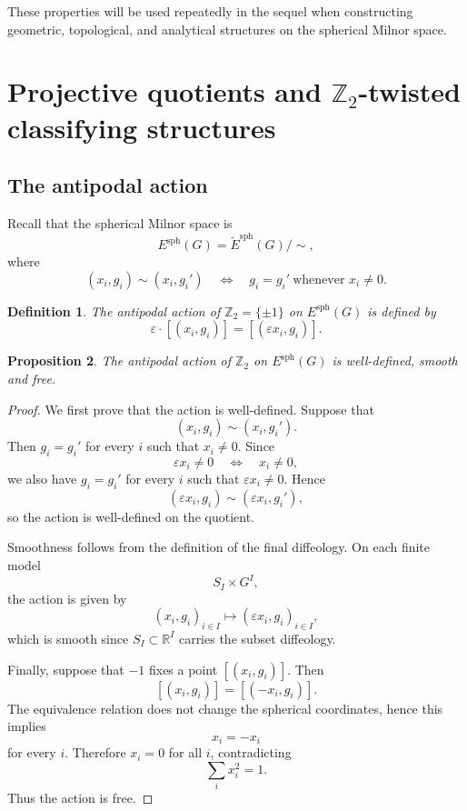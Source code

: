 \documentclass[11pt]{amsart}
\newtheorem{definition}{Definition}[section]
\newtheorem{proposition}[definition]{Proposition}
\begin{document}
These properties will be used repeatedly in the sequel when constructing
geometric, topological, and analytical structures on the spherical Milnor
space.
\section{Projective quotients and \texorpdfstring{$\mathbb Z_2$}{Z2}-twisted classifying structures}
\label{sec:projective-topology}

\subsection{The antipodal action}

Recall that the spherical Milnor space is
\[
E^{\mathrm{sph}}(G)
=
\widetilde E^{\mathrm{sph}}(G)/\sim,
\]
where
\[
(x_i,g_i)\sim (x_i,g_i')
\quad\Longleftrightarrow\quad
g_i=g_i' \ \text{whenever } x_i\neq0.
\]

\begin{definition}
The antipodal action of \(\mathbb Z_2=\{\pm1\}\) on \(E^{\mathrm{sph}}(G)\) is defined by
\[
\varepsilon\cdot [(x_i,g_i)]
=
[(\varepsilon x_i,g_i)].
\]
\end{definition}

\begin{proposition}
The antipodal action of \(\mathbb Z_2\) on \(E^{\mathrm{sph}}(G)\) is well-defined, smooth and free.
\end{proposition}

\begin{proof}
We first prove that the action is well-defined. Suppose that
\[
(x_i,g_i)\sim (x_i,g_i').
\]
Then \(g_i=g_i'\) for every \(i\) such that \(x_i\neq0\). Since
\[
\varepsilon x_i\neq0
\quad\Longleftrightarrow\quad
x_i\neq0,
\]
we also have \(g_i=g_i'\) for every \(i\) such that \(\varepsilon x_i\neq0\). Hence
\[
(\varepsilon x_i,g_i)\sim(\varepsilon x_i,g_i'),
\]
so the action is well-defined on the quotient.

Smoothness follows from the definition of the final diffeology. On each finite model
\[
S_I\times G^I,
\]
the action is given by
\[
(x_i,g_i)_{i\in I}
\longmapsto
(\varepsilon x_i,g_i)_{i\in I},
\]
which is smooth since \(S_I\subset \mathbb R^I\) carries the subset diffeology.

Finally, suppose that \(-1\) fixes a point \([(x_i,g_i)]\). Then
\[
[(x_i,g_i)]=[(-x_i,g_i)].
\]
The equivalence relation does not change the spherical coordinates, hence this implies
\[
x_i=-x_i
\]
for every \(i\). Therefore \(x_i=0\) for all \(i\), contradicting
\[
\sum_i x_i^2=1.
\]
Thus the action is free.
\end{proof}
\end{document}
